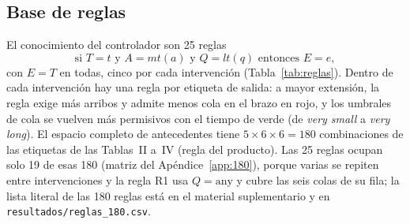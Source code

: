 \documentclass[journal]{IEEEtran}
\begin{document}
\subsection{Base de reglas}
El conocimiento del controlador son 25 reglas
\begin{equation*}
\text{si } T=t \text{ y } A=mt(a) \text{ y } Q=lt(q) \text{ entonces } E=e,
\end{equation*}
con $E=T$ en todas, cinco por cada intervención (Tabla~\ref{tab:reglas}). Dentro de cada intervención hay una regla por etiqueta de salida: a mayor extensión, la regla exige más arribos y admite menos cola en el brazo en rojo, y los umbrales de cola se vuelven más permisivos con el tiempo de verde (de \emph{very small} a \emph{very long}). El espacio completo de antecedentes tiene $5\times6\times6=180$ combinaciones de las etiquetas de las Tablas~II a~IV (regla del producto). Las 25 reglas ocupan solo 19 de esas 180 (matriz del Apéndice~\ref{app:180}), porque varias se repiten entre intervenciones y la regla R1 usa $Q=\text{any}$ y cubre las seis colas de su fila; la lista literal de las 180 reglas está en el material suplementario y en \texttt{resultados/reglas\_180.csv}.


\end{document}
